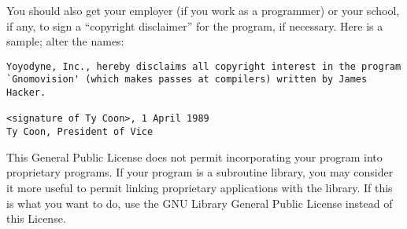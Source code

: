 \documentclass[a4paper]{report}
\begin{document}
You should also get your employer (if you work as a programmer) or your
school, if any, to sign a ``copyright disclaimer'' for the program, if
necessary.  Here is a sample; alter the names:

\begin{verbatim}
Yoyodyne, Inc., hereby disclaims all copyright interest in the program
`Gnomovision' (which makes passes at compilers) written by James Hacker.

<signature of Ty Coon>, 1 April 1989
Ty Coon, President of Vice
\end{verbatim}

This General Public License does not permit incorporating your program into
proprietary programs.  If your program is a subroutine library, you may
consider it more useful to permit linking proprietary applications with the
library.  If this is what you want to do, use the GNU Library General Public
License instead of this License.
\end{document}
